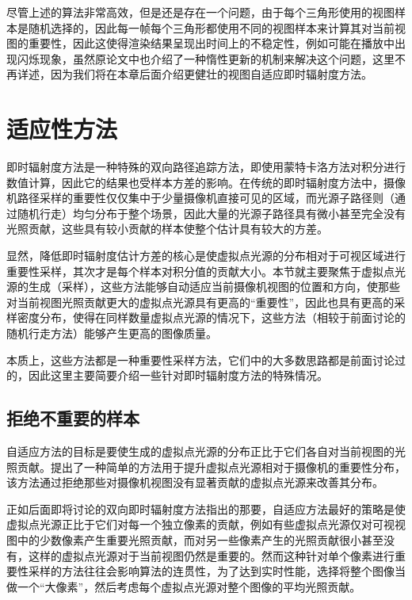 尽管上述的算法非常高效，但是还是存在一个问题，由于每个三角形使用的视图样本是随机选择的，因此每一帧每个三角形都使用不同的视图样本来计算其对当前视图的重要性，因此这使得渲染结果呈现出时间上的不稳定性，例如可能在播放中出现闪烁现象，虽然原论文中也介绍了一种惰性更新的机制来解决这个问题，这里不再详述，因为我们将在本章后面介绍更健壮的视图自适应即时辐射度方法。




\section{适应性方法}
即时辐射度方法是一种特殊的双向路径追踪方法，即使用蒙特卡洛方法对积分进行数值计算，因此它的结果也受样本方差的影响。在传统的即时辐射度方法中，摄像机路径采样的重要性仅仅集中于少量摄像机直接可见的区域，而光源子路径则（通过随机行走）均匀分布于整个场景，因此大量的光源子路径具有微小甚至完全没有光照贡献，这些具有较小贡献的样本使整个估计具有较大的方差。

显然，降低即时辐射度估计方差的核心是使虚拟点光源的分布相对于可视区域进行重要性采样，其次才是每个样本对积分值的贡献大小。本节就主要聚焦于虚拟点光源的生成（采样），这些方法能够自动适应当前摄像机视图的位置和方向，使那些对当前视图光照贡献更大的虚拟点光源具有更高的“重要性”，因此也具有更高的采样密度分布，使得在同样数量虚拟点光源的情况下，这些方法（相较于前面讨论的随机行走方法）能够产生更高的图像质量。

本质上，这些方法都是一种重要性采样方法，它们中的大多数思路都是前面讨论过的，因此这里主要简要介绍一些针对即时辐射度方法的特殊情况。




\subsection{拒绝不重要的样本}
自适应方法的目标是要使生成的虚拟点光源的分布正比于它们各自对当前视图的光照贡献。\cite{a:SimpleandRobustIterativeImportanceSamplingofVirtualPointLights}提出了一种简单的方法用于提升虚拟点光源相对于摄像机的重要性分布，该方法通过拒绝那些对摄像机视图没有显著贡献的虚拟点光源来改善其分布。

正如后面即将讨论的双向即时辐射度方法\cite{a:BidirectionalInstantRadiosity}指出的那要，自适应方法最好的策略是使虚拟点光源正比于它们对每一个独立像素的贡献，例如有些虚拟点光源仅对可视视图中的少数像素产生重要光照贡献，而对另一些像素产生的光照贡献很小甚至没有，这样的虚拟点光源对于当前视图仍然是重要的。然而这种针对单个像素进行重要性采样的方法往往会影响算法的连贯性，为了达到实时性能，\cite{a:SimpleandRobustIterativeImportanceSamplingofVirtualPointLights}选择将整个图像当做一个“大像素”，然后考虑每个虚拟点光源对整个图像的平均光照贡献。

